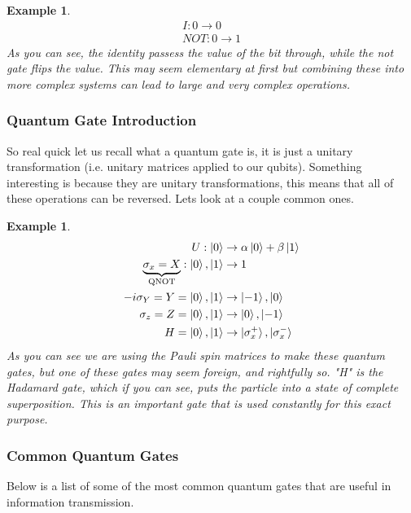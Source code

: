 \documentclass[12pt]{article}
\theoremstyle{plain}
\theoremstyle{nonumberplain}
\theoremstyle{plain}
\newtheorem{example}[lemma]{Example}
\theoremstyle{nonumberplain}
\newcommand\1{{\bf 1}}
\newcommand{\<}{\left\langle}
\renewcommand{\>}{\right\rangle}
\begin{document}
\begin{example}
\begin{equation}
\begin{split}
I: 0 \rightarrow 0\\
NOT: 0 \rightarrow 1
\end{split}
\end{equation}
As you can see, the identity passess the value of the bit through, while the not gate flips the value.  This may seem elementary at first but combining these into more complex systems can lead to large and very complex operations.  
\end{example}

\subsubsection{Quantum Gate Introduction}
So real quick let us recall what a quantum gate is, it is just a unitary transformation (i.e. unitary matrices applied to our qubits).  Something interesting is because they are unitary transformations, this means that all of these operations can be reversed.  Lets look at a couple common ones.

\begin{example}
\begin{equation}
\begin{split}
U: \ket{0} &\rightarrow \alpha\ket{0} + \beta\ket{1}\\
\underbrace{\sigma_x = X}_{\text{QNOT}}: \ket{0},\ket{1} &\rightarrow 1\\
-i\sigma_Y = Y =  \ket{0},\ket{1} &\rightarrow \ket{-1},\ket{0} \\
\sigma_z = Z =  \ket{0},\ket{1} &\rightarrow \ket{0},\ket{-1}\\
H =  \ket{0},\ket{1} &\rightarrow \ket{\sigma_x^+},\ket{\sigma_x^-} \\ 
\end{split}
\end{equation}
As you can see we are using the Pauli spin matrices to make these quantum gates, but one of these gates may seem foreign, and rightfully so. "H" is the Hadamard gate, which if you can see, puts the particle into a state of complete superposition.  This is an important gate that is used constantly for this exact purpose.   
\end{example} 


\subsubsection{Common Quantum Gates}
Below is a list of some of the most common quantum gates that are useful in information transmission.\\
\end{document}
